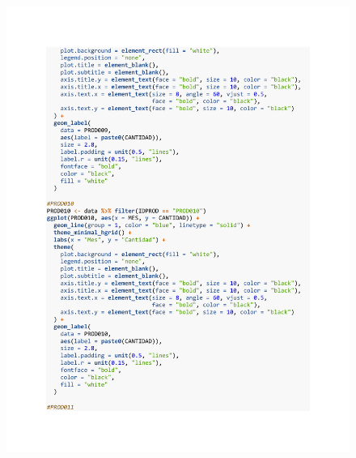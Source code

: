 \begin{figure}[h!]
        \begin{tcolorbox}[colback=white, colframe=black, boxrule=1.5pt, sharp corners=all]
            {\includegraphics[width=\linewidth, height=22cm, trim=2.5cm 2.5cm 2.5cm 2.5cm, clip]{images/script11.pdf}}
        \end{tcolorbox}
\end{figure}

